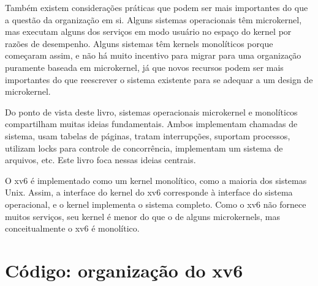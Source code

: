 Também existem considerações práticas que podem ser mais importantes
do que a questão da organização em si. Alguns sistemas operacionais
têm microkernel, mas executam alguns dos serviços em modo usuário no espaço do kernel
por razões de desempenho. Alguns sistemas têm kernels monolíticos
porque começaram assim, e não há muito incentivo para migrar para uma organização
puramente baseada em microkernel, já que novos recursos podem ser mais importantes
do que reescrever o sistema existente para se adequar a um design de microkernel.

Do ponto de vista deste livro, sistemas operacionais microkernel e monolíticos
compartilham muitas ideias fundamentais. Ambos implementam chamadas de sistema, usam
tabelas de páginas, tratam interrupções, suportam processos, utilizam
locks para controle de concorrência, implementam um sistema de arquivos,
etc. Este livro foca nessas ideias centrais.

O xv6 é
implementado como um kernel monolítico, como a maioria dos sistemas Unix.
Assim, a interface do kernel do xv6 corresponde à interface do sistema operacional,
e o kernel implementa o sistema completo. Como
o xv6 não fornece muitos serviços, seu kernel é menor do que o de alguns
microkernels, mas conceitualmente o xv6 é monolítico.

\section{Código: organização do xv6}

